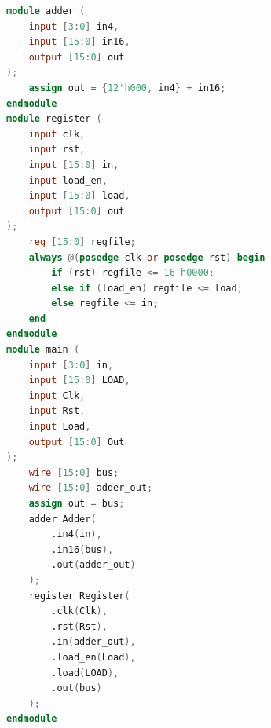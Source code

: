 \documentclass[11pt]{homework}
\begin{document}
\question
\begin{lstlisting}[language=Verilog]
module adder (
    input [3:0] in4,
    input [15:0] in16,
    output [15:0] out
);
    assign out = {12'h000, in4} + in16;
endmodule
module register (
    input clk,
    input rst,
    input [15:0] in,
    input load_en,
    input [15:0] load,
    output [15:0] out 
);
    reg [15:0] regfile;
    always @(posedge clk or posedge rst) begin
        if (rst) regfile <= 16'h0000;
        else if (load_en) regfile <= load;
        else regfile <= in;
    end
endmodule
module main (
    input [3:0] in,
    input [15:0] LOAD,
    input Clk,
    input Rst,
    input Load,
    output [15:0] Out 
);
    wire [15:0] bus;
    wire [15:0] adder_out;
    assign out = bus;
    adder Adder(
        .in4(in), 
        .in16(bus), 
        .out(adder_out)
    );
    register Register(
        .clk(Clk), 
        .rst(Rst), 
        .in(adder_out),
        .load_en(Load), 
        .load(LOAD), 
        .out(bus)
    );
endmodule
\end{lstlisting}
\end{document}
